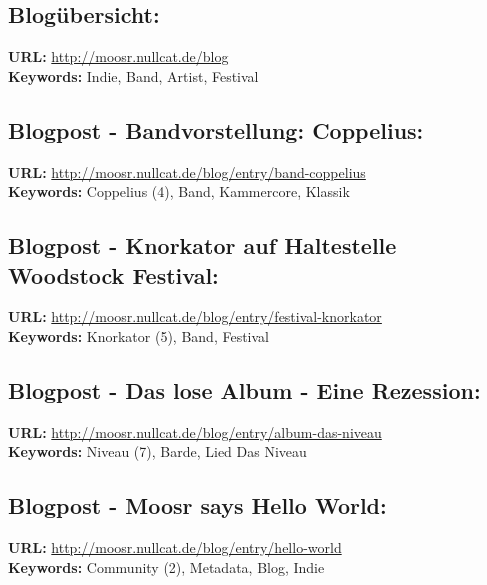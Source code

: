 \subsection{Blogübersicht:}

\textbf{URL:} \url{http://moosr.nullcat.de/blog}
\\
\textbf{Keywords:} Indie, Band, Artist, Festival

\subsection{Blogpost - Bandvorstellung: Coppelius:} 

\textbf{URL:} \url{http://moosr.nullcat.de/blog/entry/band-coppelius}
\\
\textbf{Keywords:} Coppelius (4), Band, Kammercore, Klassik

\subsection{Blogpost - Knorkator auf Haltestelle Woodstock Festival:} 

\textbf{URL:} \url{http://moosr.nullcat.de/blog/entry/festival-knorkator}
\\
\textbf{Keywords:} Knorkator (5), Band, Festival

\subsection{Blogpost - Das lose Album - Eine Rezession:} 

\textbf{URL:} \url{http://moosr.nullcat.de/blog/entry/album-das-niveau}
\\
\textbf{Keywords:} Niveau (7), Barde, Lied	Das Niveau

\subsection{Blogpost - Moosr says Hello World:}

\textbf{URL:}  \url{http://moosr.nullcat.de/blog/entry/hello-world}
\\
\textbf{Keywords:} Community (2), Metadata, Blog, Indie

